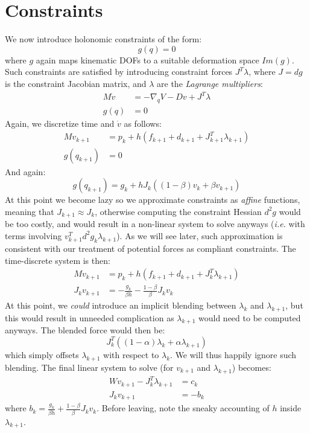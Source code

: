 \documentclass{article}
\newcommand{\dd}{d}
\newcommand{\block}[1]{\left(#1\right)}
\begin{document}
\section{Constraints}
\label{sec:constraints}
%
We now introduce holonomic constraints of the form:
%
\begin{equation}
  g(q) = 0
\end{equation}
%
where $g$ again maps kinematic DOFs to a suitable deformation space
$Im(g)$. Such constraints are satisfied by introducing constraint
forces $J^T\lambda$, where $J = \dd g$ is the constraint Jacobian
matrix, and $\lambda$ are the \emph{Lagrange multipliers}:
%
\begin{align}
  \label{eq:constrained-dynamics}
  M \dot{v} &= -\nabla_q V - D v + J^T \lambda\\
  g(q) &= 0
\end{align}
%
Again, we discretize time and $\dot{v}$ as follows:
%
\begin{align}
  M v_{k+1} &= p_k + h \block{f_{k+1} + d_{k+1} + J_{k+1}^T\lambda_{k+1}} \\
  g\block{q_{k+1}} &= 0 
\end{align}
%
And again:
\begin{equation}
g( q_{k+1}) = g_k + h J_k \block{ (1 - \beta) v_k + \beta v_{k+1}}  
\end{equation}
%
At this point we become lazy so we approximate constraints as
\emph{affine} functions, meaning that $J_{k+1} \approx J_k$, otherwise
computing the constraint Hessian $\dd^2 g$ would be too costly, and
would result in a non-linear system to solve anyways (\emph{i.e.}
with terms involving $v_{k+1}^T\dd^2g_k \lambda_{k+1}$). As we will
see later, such approximation is consistent with our treatment of
potential forces as compliant constraints. The time-discrete system is
then:
%
\begin{align}
  M v_{k+1} &= p_k + h \block{f_{k+1} + d_{k+1} + J_k^T\lambda_{k+1}} \\
  J_k v_{k+1} &= -\frac{g_k}{\beta h} - \frac{1 - \beta}{\beta} J_k v_k
\end{align}
% 
At this point, we \emph{could} introduce an implicit blending between
$\lambda_k$ and $\lambda_{k+1}$, but this would result in unneeded
complication as $\lambda_{k+1}$ would need to be computed anyways. The
blended force would then be:
\[ J_k^T\block{ (1-\alpha) \lambda_k + \alpha \lambda_{k+1} } \] which
simply offsets $\lambda_{k+1}$ with respect to $\lambda_k$. We will
thus happily ignore such blending. The final linear system to solve
(for $v_{k+1}$ and $\lambda_{k+1}$) becomes:
%
\begin{align}
\label{eq:constrained-integrator}
  W v_{k+1} - J_k^T \lambda_{k+1} &= c_k  \\
  J_k v_{k+1} &= -b_k
\end{align}
where $b_k = \frac{g_k}{\beta h} + \frac{1 - \beta}{\beta} J_k
v_k$. Before leaving, note the sneaky accounting of $h$ inside
$\lambda_{k+1}$.
%
\end{document}
